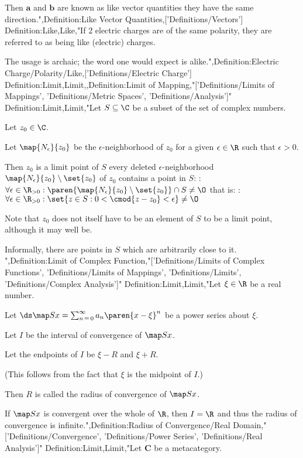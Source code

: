 Then $\mathbf a$ and $\mathbf b$ are known as like vector quantities  they have the same direction.",Definition:Like Vector Quantities,['Definitions/Vectors']
Definition:Like,Like,"If $2$ electric charges are of the same polarity, they are referred to as being like (electric) charges.


The usage is archaic; the word one would expect is alike.",Definition:Electric Charge/Polarity/Like,['Definitions/Electric Charge']
Definition:Limit,Limit,,Definition:Limit of Mapping,"['Definitions/Limits of Mappings', 'Definitions/Metric Spaces', 'Definitions/Analysis']"
Definition:Limit,Limit,"Let $S \subseteq \C$ be a subset of the set of complex numbers.

Let $z_0 \in \C$. 

Let $\map {N_\epsilon} {z_0}$ be the $\epsilon$-neighborhood of $z_0$ for a given $\epsilon \in \R$ such that $\epsilon > 0$.


Then $z_0$ is a limit point of $S$  every deleted $\epsilon$-neighborhood $\map {N_\epsilon} {z_0} \setminus \set {z_0}$ of $z_0$ contains a point in $S$:
:$\forall \epsilon \in \R_{>0}: \paren {\map {N_\epsilon} {z_0} \setminus \set {z_0} } \cap S \ne \O$
that is:
:$\forall \epsilon \in \R_{>0}: \set {z \in S: 0 < \cmod {z - z_0} < \epsilon} \ne \O$


Note that $z_0$ does not itself have to be an element of $S$ to be a limit point, although it may well be.

Informally, there are points in $S$ which are arbitrarily close to it.
",Definition:Limit of Complex Function,"['Definitions/Limits of Complex Functions', 'Definitions/Limits of Mappings', 'Definitions/Limits', 'Definitions/Complex Analysis']"
Definition:Limit,Limit,"Let $\xi \in \R$ be a real number.

Let $\ds \map S x = \sum_{n \mathop = 0}^\infty a_n \paren {x - \xi}^n$ be a power series about $\xi$.

Let $I$ be the interval of convergence of $\map S x$.

Let the endpoints of $I$ be $\xi - R$ and $\xi + R$.

(This follows from the fact that $\xi$ is the midpoint of $I$.)


Then $R$ is called the radius of convergence of $\map S x$.


If $\map S x$ is convergent over the whole of $\R$, then $I = \R$ and thus the radius of convergence is infinite.",Definition:Radius of Convergence/Real Domain,"['Definitions/Convergence', 'Definitions/Power Series', 'Definitions/Real Analysis']"
Definition:Limit,Limit,"Let $\mathbf C$ be a metacategory.

